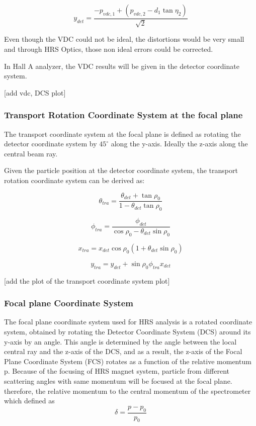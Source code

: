 \begin{equation}
    y_{det} = \frac{-p_{vdc,1} + (p_{vdc,2} - d_1\tan{\eta_2})}{\sqrt{2}}
\end{equation}

Even though the VDC could not be ideal, the distortions would be very small and through HRS Optics, those non ideal errors could be corrected. 

In Hall A analyzer, the VDC results will be given in the detector  coordinate system.

[add vdc, DCS plot]

\subsubsection{Transport Rotation Coordinate System at the focal plane}
The transport coordinate system at the focal plane is defined as rotating the detector coordinate system by $45^{\circ}$ along the y-axis. Ideally the z-axis along the central beam ray. 

Given the particle position at the detector coordinate system, the transport rotation coordinate system can be derived as:

\begin{equation}
    \theta_{tra}  = \frac{\theta_{det} + \tan{\rho_0}}{1 - \theta_{det}\tan{\rho_0}} 
\end{equation}

\begin{equation}
    \phi_{tra} = \frac{\phi_{det}}{\cos{\rho_0} - \theta_{det}\sin{\rho_0}}
\end{equation}

\begin{equation}
    x_{tra} = x_{det}\cos{\rho_0}(1 + \theta_{det}\sin{\rho_0})
\end{equation}

\begin{equation}
    y_{tra} = y_{det} + \sin{\rho_0}\phi_{tra}x_{det}
\end{equation}


[add the plot of the transport coordinate system plot]


\subsubsection{Focal plane Coordinate System}

The focal plane coordinate system used for HRS analysis is a rotated coordinate system, obtained by rotating the Detector Coordinate System (DCS) around its y-axis by an angle. This angle is determined by the angle between the local central ray and the z-axis of the DCS, and as a result, the z-axis of the Focal Plane Coordinate System (FCS) rotates as a function of the relative momentum p. Because of the focusing of HRS magnet system,  particle from different scattering angles with same momentum will be focused at the focal plane. therefore, the relative momentum to the central momentum of the spectrometer which defined as 
\begin{equation}
    \delta = \frac{p-p_0}{p_0}
\end{equation}

